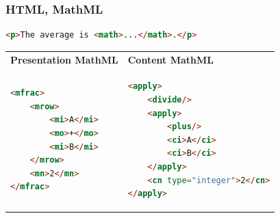 \documentclass[aspectratio=169]{beamer}
\begin{document}
\begin{frame}[fragile]
    \frametitle{HTML, MathML}

    \begin{lstlisting}[language=HTML]
<p>The average is <math>...</math>.</p>
    \end{lstlisting}

    \vspace{2em}
    \begin{tabular}{p{6cm} | p{6cm}}
        \textbf{Presentation MathML} & \textbf{Content MathML} \\
        \small
        \begin{lstlisting}[language=HTML]
<mfrac>
    <mrow>
        <mi>A</mi>
        <mo>+</mo>
        <mi>B</mi>
    </mrow>
    <mn>2</mn>
</mfrac>
        \end{lstlisting} & 
        \small
        \begin{lstlisting}[language=HTML]
<apply>
    <divide/>
    <apply>
        <plus/>
        <ci>A</ci>
        <ci>B</ci>
    </apply>
    <cn type="integer">2</cn>
</apply>
        \end{lstlisting}
    \end{tabular}
\end{frame}

\end{document}
